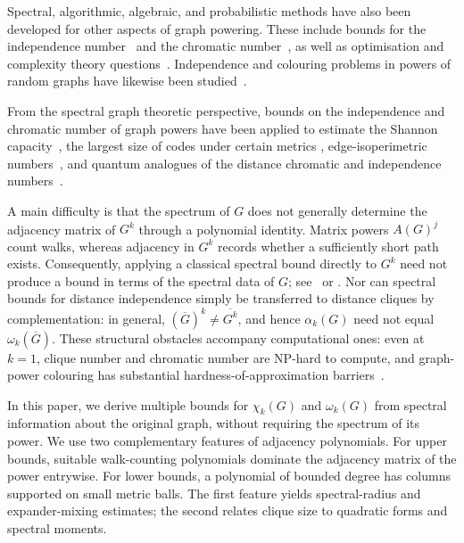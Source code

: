 \documentclass[11pt]{article}
\theoremstyle{plain}
\numberwithin{equation}{section}
\begin{document}
Spectral, algorithmic, algebraic, and probabilistic methods have also been developed for other aspects of graph powering. These include bounds for the independence number~\cite{Atkinson_Frieze_2004,Abiad_Cioaba_Tait_2016,Abiad_Coutinho_Fiol_2019,Abiad_Zhou_2026} and the chromatic number~\cite{Alon_Mohar_2002,Kierstead_Yang_Yi_2020,Abiad_Coutinho_Fiol_Nogueira_Zeijlemaker_2022, Abiad_Zhou_2026}, as well as optimisation and complexity theory questions~\cite{Agnarsson_Halldorsson_2003,Molloy_Salavatipour_2005,Abiad_Hoesel_Michaux_2026,Chalermsook_Laekhanukit_Nanongkai_2014}. Independence and colouring problems in powers of random graphs have likewise been studied~\cite{Atkinson_Frieze_2004,Garapaty_Lokshtanov_Maji_Pothen_2023,Frieze_Kang_Raut_Sweering_Verbeek_2026}.


From the spectral graph theoretic perspective, bounds on the independence and chromatic number of graph powers have been applied to estimate the Shannon capacity~\cite{Fiol_2020, Abiad_Dalfo_Fiol_2026}, the largest size of codes under certain metrics \cite{APR2025,AbiadNeriReijnders2025}, edge-isoperimetric numbers~\cite{Abiad_vandeBerg_Juliano_Reijnders_Simoens_vanVeluw_Wittebol_2026}, and quantum analogues of the distance chromatic and independence numbers~\cite{Abiad_Jany_2025,Abiad_Meeus_2025,Wocjan_Elphick_Abiad_2022}. 

A main difficulty is that the spectrum of $G$ does not generally determine the adjacency matrix of $G^k$ through a polynomial identity. Matrix powers $A(G)^j$ count walks, whereas adjacency in $G^k$ records whether a sufficiently short path exists. Consequently, applying a classical spectral bound directly to $G^k$ need not produce a bound in terms of the spectral data of $G$; see~\cite[Sections~2 and~3]{Abiad_Coutinho_Fiol_Nogueira_Zeijlemaker_2022} or \cite{Das_Guo_2013, Xing_Zhou_2017}. Nor can spectral bounds for distance independence simply be transferred to distance cliques by complementation: in general, $(\overline{G})^k\neq\overline{G^k}$, and hence $\alpha_k(G)$ need not equal $\omega_k(\overline{G})$. These structural obstacles accompany computational ones: even at $k=1$, clique number and chromatic number are NP-hard to compute, and graph-power colouring has substantial hardness-of-approximation barriers~\cite{Chalermsook_Laekhanukit_Nanongkai_2014}.

In this paper, we derive multiple bounds for $\chi_k(G)$ and $\omega_k(G)$ from spectral information about the original graph, without requiring the spectrum of its power. We use two complementary features of adjacency polynomials. For upper bounds, suitable walk-counting polynomials dominate the adjacency matrix of the power entrywise. For lower bounds, a polynomial of bounded degree has columns supported on small metric balls. The first feature yields spectral-radius and expander-mixing estimates; the second relates clique size to quadratic forms and spectral moments.
\end{document}
